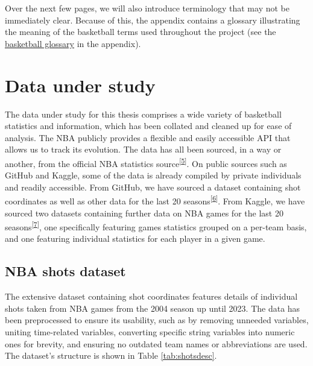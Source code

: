 \documentclass[
  12pt,
  a4paper,
]{article}
\begin{document}
Over the next few pages, we will also introduce terminology that may not be immediately clear. Because of this, the appendix contains a glossary illustrating the meaning of the basketball terms used throughout the project (see the \protect\hyperlink{glossary}{basketball glossary} in the appendix).

\hypertarget{data-under-study}{%
\section{Data under study}\label{data-under-study}}

The data under study for this thesis comprises a wide variety of basketball statistics and information, which has been collated and cleaned up for ease of analysis. The NBA publicly provides a flexible and easily accessible API that allows us to track its evolution. The data has all been sourced, in a way or another, from the official NBA statistics source\textsuperscript{{[}\protect\hyperlink{ref-NBAStats}{5}{]}}. On public sources such as GitHub and Kaggle, some of the data is already compiled by private individuals and readily accessible. From GitHub, we have sourced a dataset containing shot coordinates as well as other data for the last 20 seasons\textsuperscript{{[}\protect\hyperlink{ref-GithubNBAShots}{6}{]}}. From Kaggle, we have sourced two datasets containing further data on NBA games for the last 20 seasons\textsuperscript{{[}\protect\hyperlink{ref-KaggleNBAGames}{7}{]}}, one specifically featuring games statistics grouped on a per-team basis, and one featuring individual statistics for each player in a given game.

\hypertarget{nba-shots-dataset}{%
\subsection{NBA shots dataset}\label{nba-shots-dataset}}

The extensive dataset containing shot coordinates features details of individual shots taken from NBA games from the 2004 season up until 2023. The data has been preprocessed to ensure its usability, such as by removing unneeded variables, uniting time-related variables, converting specific string variables into numeric ones for brevity, and ensuring no outdated team names or abbreviations are used. The dataset's structure is shown in Table \ref{tab:shotsdesc}.
\end{document}
